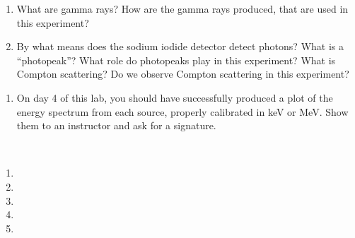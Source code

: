 \documentclass{../signatures}
\begin{document}
\maketitle

\names

\gmasafty

\prelab

\begin{enumerate}
    \item What are gamma rays? How are the gamma rays produced, that are used in this experiment?
    \item By what means does the sodium iodide detector detect photons? What is a ``photopeak''? What role do photopeaks play in this experiment? What is Compton scattering? Do we observe Compton scattering in this experiment?
    \\[32pt]
\end{enumerate}

\prelabsignatures

\midlab

\begin{enumerate}
    \item On day 4 of this lab, you should have successfully produced a plot of the energy spectrum from each source, properly calibrated in keV or MeV. Show them to an instructor and ask for a signature.
    \\[32pt]
\end{enumerate}


\checkpointsection 
\\[12pt]
\begin{enumerate}

\item {}

\item {}

\item {}

\item {}

\item {}

\end{enumerate}
\end{document}
